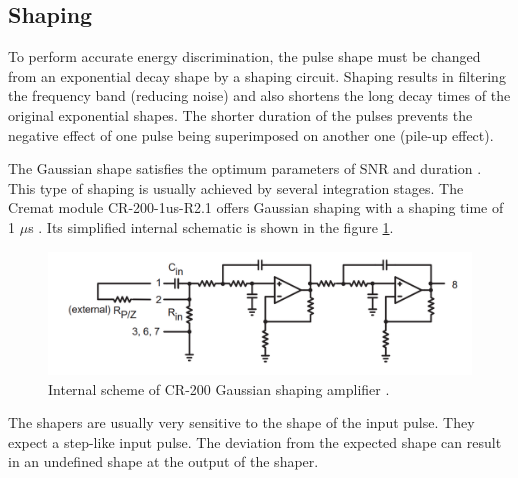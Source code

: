 \subsection{Shaping}
To perform accurate energy discrimination, the pulse shape must be changed from an exponential decay shape by a shaping circuit. Shaping results in filtering the frequency band (reducing noise) and also shortens the long decay times of the original exponential shapes. The shorter duration of the pulses prevents the negative effect of one pulse being superimposed on another one (pile-up effect).

\par
The Gaussian shape satisfies the optimum parameters of SNR and duration \cite{Shapflify}. This type of shaping is usually achieved by several integration stages. The Cremat module CR-200-1us-R2.1 offers Gaussian shaping with a shaping time of 1 $\mu$s \cite{cr200}. Its simplified internal schematic is shown in the figure \ref{internal2}.  
%


\begin{figure}[H]
 \centering
 \includegraphics[scale=0.35, angle = 0]{./pictures/CRshaper.png}
 \caption{Internal scheme of CR-200 Gaussian shaping amplifier \cite{cr200}.}
 \label{internal2}
 
\end{figure}
The shapers are usually very sensitive to the shape of the input pulse. They expect a step-like input pulse. The deviation from the expected shape can result in an undefined shape at the output of the shaper.

